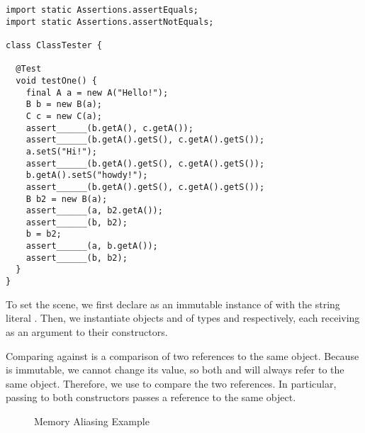 \begin{lstlisting}[language=MyJava]
import static Assertions.assertEquals;
import static Assertions.assertNotEquals;

class ClassTester {

  @Test
  void testOne() {
    final A a = new A("Hello!");
    B b = new B(a);
    C c = new C(a);
    assert______(b.getA(), c.getA());
    assert______(b.getA().getS(), c.getA().getS());
    a.setS("Hi!");
    assert______(b.getA().getS(), c.getA().getS());
    b.getA().setS("howdy!");
    assert______(b.getA().getS(), c.getA().getS());
    B b2 = new B(a);
    assert______(a, b2.getA());
    assert______(b, b2);
    b = b2;
    assert______(a, b.getA());
    assert______(b, b2);
  }
}
\end{lstlisting}

To set the scene, we first declare  as an immutable instance of  with the string literal . 
Then, we instantiate objects  and  of types  and  respectively, each receiving  as an argument to their constructors. 

Comparing  against  is a comparison of two references to the same object. 
Because  is immutable, we cannot change its value, so both  and  will always refer to the same object. 
Therefore, we use  to compare the two references. 
In particular, passing  to both constructors passes a reference to the same object.

\begin{figure}[htp!]
\centering
{}
\caption{Memory Aliasing Example}
\label{fig:memoryref}
\end{figure}

